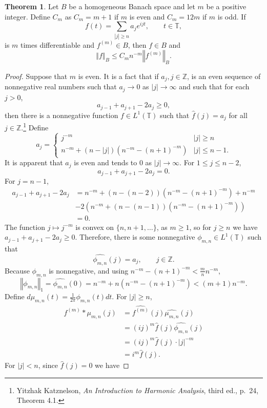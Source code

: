 \documentclass{article}
\newcommand{\norm}[1]{\left\Vert #1 \right\Vert}
\theoremstyle{definition}
\newtheorem{theorem}{Theorem}
\theoremstyle{definition}
\begin{document}
\begin{theorem}
Let $B$ be a homogeneous Banach space and let $m$ be a positive integer.
Define $C_m$ as $C_m=m+1$ if  $m$ is even and $C_m=12m$ if $m$ is odd.
If
\[
f(t)=\sum_{|j| \geq n} a_j e^{ijt}, \qquad t \in \mathbb{T},
\]
is $m$ times differentiable and $f^{(m)} \in B$, then
$f \in B$ and 
\[
\norm{f}_B \leq C_m n^{-m} \norm{f^{(m)}}_B.
\]
\end{theorem}
\begin{proof}
Suppose that $m$ is even.
It is a fact that if $a_j,  j\in \mathbb{Z}$, is an even sequence of nonnegative real numbers such that $a_j \to 0$ as $|j| \to \infty$ and 
such that for each $j>0$,
\[
a_{j-1}+a_{j+1}-2a_j \geq 0,
\]
then there is a nonnegative function $f \in L^1(\mathbb{T})$ such that
$\hat{f}(j)=a_j$ for all $j \in \mathbb{Z}$.\footnote{Yitzhak Katznelson, {\em An Introduction to Harmonic
Analysis}, third ed., p.~24, Theorem 4.1.}
Define 
\[
a_j = \begin{cases}
j^{-m}&|j| \geq n\\
n^{-m} + (n-|j|)(n^{-m}-(n+1)^{-m})&|j| \leq n-1.
\end{cases}
\]
It is apparent that $a_j$ is even and tends to $0$ as $|j| \to \infty$. For 
$1 \leq j \leq n-2$,
\[
a_{j-1}+a_{j+1}-2a_j = 0.
\]
For $j=n-1$,
\begin{align*}
a_{j-1}+a_{j+1}-2a_j &= n^{-m}+(n-(n-2))(n^{-m}-(n+1)^{-m})+n^{-m}\\
&-2\left(n^{-m} + (n-(n-1))(n^{-m}-(n+1)^{-m})\right)\\
&=0.
\end{align*}
The function $j \mapsto j^{-m}$ is convex on $\{n,n+1,\ldots\}$, as $m \geq 1$, so
for $j \geq n$ we have $a_{j-1}+a_{j+1}-2a_j \geq 0$. Therefore,
there is some nonnegative $\phi_{m,n} \in L^1(\mathbb{T})$ such that
\[
\widehat{\phi_{m,n}}(j) = a_j, \qquad j \in \mathbb{Z}.
\]
Because $\phi_{m,n}$ is nonnegative, and using
$n^{-m}-(n+1)^{-m} < \frac{m}{n} n^{-m}$,
\[
\norm{\phi_{m,n}}_1 = \widehat{\phi_{m,n}}(0) = n^{-m}+n(n^{-m}-(n+1)^{-m})
<(m+1)n^{-m}.
\]
Define $d\mu_{m,n}(t) =\frac{1}{2\pi} \phi_{m,n}(t) dt$. 
For
$|j| \geq n$,
\begin{align*}
\widehat{f^{(m)}*\mu_{m,n}}(j)&=\widehat{f^{(m)}}(j) \widehat{\mu_{m,n}}(j)\\
&=(ij)^m \hat{f}(j) \widehat{\phi_{m,n}}(j)\\
&=(ij)^m \hat{f}(j)  \cdot |j|^{-m}\\
&=i^m \hat{f}(j).
\end{align*}
For $|j|<n$, since $\hat{f}(j)=0$ we have

\end{proof}
\end{document}
